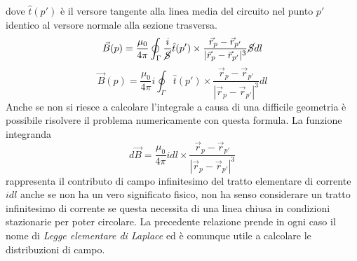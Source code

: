 dove $\hat{t}(p')$ è il versore tangente alla linea media del circuito nel punto $p'$ 
identico al versore normale alla sezione trasversa.
$$
\vec{B}(p) = \frac{\mu_0}{4\pi}\oint_\Gamma \frac{i}{\cancel{S}}\hat{t}(p')\times\frac{\vec{r}_p-\vec{r}_{p'}}{|\vec{r}_p-\vec{r}_{p'}|^3} \cancel{S}dl
$$
$$
\vec{B}(p) = \frac{\mu_0}{4 \pi} i \oint_\Gamma \hat{t}(p') \times \frac{\vec{r}_p-\vec{r}_{p'}}{|\vec{r}_p-\vec{r}_{p'}|^3} dl
$$
Anche se non si riesce a calcolare l'integrale a causa di una difficile geometria
è possibile risolvere il problema numericamente con questa formula.
La funzione integranda
$$
d\vec{B} = \frac{\mu_0}{4\pi} i dl \times \frac{\vec{r}_p - \vec{r}_{p'}}{|\vec{r}_p - \vec{r}_{p'}|^3}
$$
rappresenta il contributo di campo infinitesimo del tratto elementare di corrente $idl$
anche se non ha un vero significato fisico, non ha senso considerare un tratto infinitesimo
di corrente se questa necessita di una linea chiusa in condizioni stazionarie per poter 
circolare. La precedente relazione prende in ogni caso il nome di 
\textit{Legge elementare di Laplace} ed è comunque utile a calcolare le distribuzioni
di campo.

